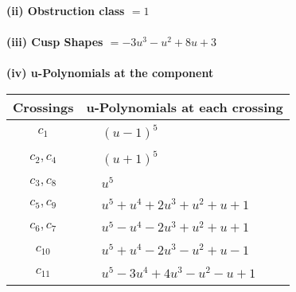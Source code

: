 \documentclass[1p]{elsarticle_modified}
\theoremstyle{definition}
\begin{document}
\flushleft \textbf{(ii) Obstruction class $= 1$}\\~\\
\flushleft \textbf{(iii) Cusp Shapes $= -3 u^3- u^2+8 u+3$}\\~\\
\newpage\renewcommand{\arraystretch}{1}
\flushleft \textbf{(iv) u-Polynomials at the component}\newline \\
\begin{tabular}{m{50pt}|m{274pt}}
Crossings & \hspace{64pt}u-Polynomials at each crossing \\
\hline $$\begin{aligned}c_{1}\end{aligned}$$&$\begin{aligned}
&(u-1)^5
\end{aligned}$\\
\hline $$\begin{aligned}c_{2},c_{4}\end{aligned}$$&$\begin{aligned}
&(u+1)^5
\end{aligned}$\\
\hline $$\begin{aligned}c_{3},c_{8}\end{aligned}$$&$\begin{aligned}
&u^5
\end{aligned}$\\
\hline $$\begin{aligned}c_{5},c_{9}\end{aligned}$$&$\begin{aligned}
&u^5+u^4+2 u^3+u^2+u+1
\end{aligned}$\\
\hline $$\begin{aligned}c_{6},c_{7}\end{aligned}$$&$\begin{aligned}
&u^5- u^4-2 u^3+u^2+u+1
\end{aligned}$\\
\hline $$\begin{aligned}c_{10}\end{aligned}$$&$\begin{aligned}
&u^5+u^4-2 u^3- u^2+u-1
\end{aligned}$\\
\hline $$\begin{aligned}c_{11}\end{aligned}$$&$\begin{aligned}
&u^5-3 u^4+4 u^3- u^2- u+1
\end{aligned}$\\
\hline
\end{tabular}\\~\\
\end{document}
